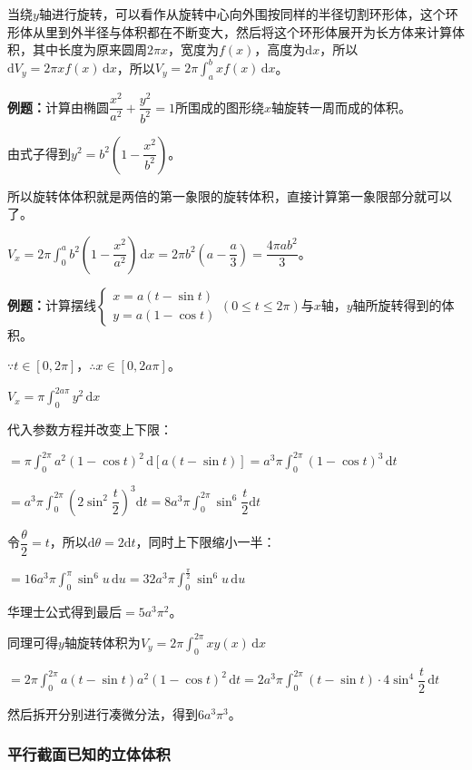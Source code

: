 \documentclass[UTF8, 12pt]{ctexart}
\begin{document}
当绕$y$轴进行旋转，可以看作从旋转中心向外围按同样的半径切割环形体，这个环形体从里到外半径与体积都在不断变大，然后将这个环形体展开为长方体来计算体积，其中长度为原来圆周$2\pi x$，宽度为$f(x)$，高度为$\textrm{d}x$，所以$\textrm{d}V_y=2\pi xf(x)\,\textrm{d}x$，所以$V_y=2\pi\int_a^bxf(x)\,\textrm{d}x$。

\textbf{例题：}计算由椭圆$\dfrac{x^2}{a^2}+\dfrac{y^2}{b^2}=1$所围成的图形绕$x$轴旋转一周而成的体积。

由式子得到$y^2=b^2\left(1-\dfrac{x^2}{b^2}\right)$。

所以旋转体体积就是两倍的第一象限的旋转体积，直接计算第一象限部分就可以了。

$V_x=2\pi\displaystyle{\int_0^ab^2\left(1-\dfrac{x^2}{a^2}\right)\,\textrm{d}x}=2\pi b^2\left(a-\dfrac{a}{3}\right)=\dfrac{4\pi ab^2}{3}$。

\textbf{例题：}计算摆线$\left\{\begin{array}{l}
    x=a(t-\sin t) \\
    y=a(1-\cos t)
\end{array}
\right.$$(0\leqslant t\leqslant 2\pi)$与$x$轴，$y$轴所旋转得到的体积。

$\because t\in[0,2\pi]$，$\therefore x\in[0,2a\pi]$。

$V_x=\pi\int_0^{2a\pi}y^2\,\textrm{d}x$

代入参数方程并改变上下限：

$=\pi\int_0^{2\pi}a^2(1-\cos t)^2\,\textrm{d}[a(t-\sin t)]=a^3\pi\int_0^{2\pi}(1-\cos t)^3\,\textrm{d}t$

$=a^3\pi\displaystyle{\int_0^{2\pi}\left(2\sin^2\dfrac{t}{2}\right)^3\textrm{d}t}=8a^3\pi\displaystyle{\int_0^{2\pi}\sin^6\dfrac{t}{2}\textrm{d}t}$

令$\dfrac{\theta}{2}=t$，所以$\textrm{d}\theta=2\textrm{d}t$，同时上下限缩小一半：

$=16a^3\pi\int_0^\pi\sin^6u\,\textrm{d}u=32a^3\pi\int_0^{\frac{\pi}{2}}\sin^6u\,\textrm{d}u$

华理士公式得到最后$=5a^3\pi^2$。

同理可得$y$轴旋转体积为$V_y=2\pi\int_0^{2\pi}xy(x)\,\textrm{d}x$

$=2\pi\int_0^{2\pi}a(t-\sin t)a^2(1-\cos t)^2\,\textrm{d}t=2a^3\pi\int_0^{2\pi}(t-\sin t)\cdot 4\sin^4\dfrac{t}{2}\,\textrm{d}t$

然后拆开分别进行凑微分法，得到$6a^3\pi^3$。

\subsubsection{平行截面已知的立体体积}
\end{document}
